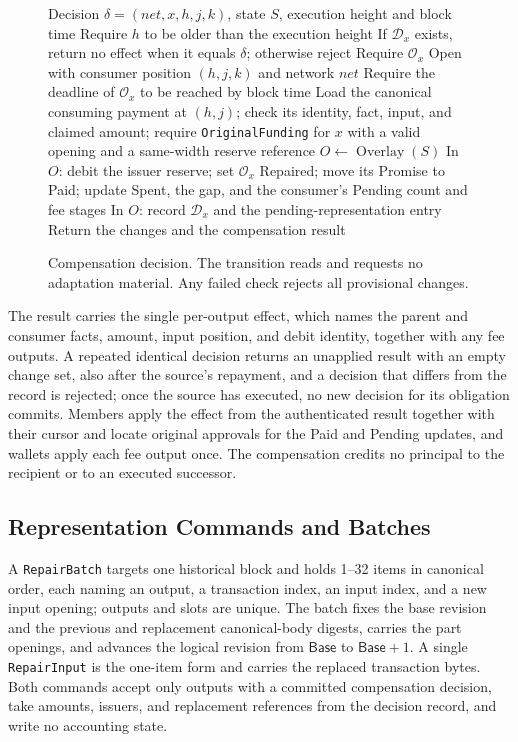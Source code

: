\begin{figure}[t]
  \small
  \begin{algorithmic}[1]
    \REQUIRE Decision $\delta=(\mathit{net},x,h,j,k)$, state $S$,
    execution height and block time
    \STATE Require $h$ to be older than the execution height
    \STATE If $\mathcal D_x$ exists, return no effect when it equals
    $\delta$; otherwise reject
    \STATE Require $\mathcal O_x$ Open with consumer position $(h,j,k)$
    and network $\mathit{net}$
    \STATE Require the deadline of $\mathcal O_x$ to be reached by block time
    \STATE Load the canonical consuming payment at $(h,j)$; check its
    identity, fact, input, and claimed amount; require
    \texttt{OriginalFunding} for $x$ with a valid opening and a
    same-width reserve reference
    \STATE $O\gets\operatorname{Overlay}(S)$
    \STATE In $O$: debit the issuer reserve; set $\mathcal O_x$ Repaired;
    move its Promise to Paid; update Spent, the gap, and the consumer's
    Pending count and fee stages
    \STATE In $O$: record $\mathcal D_x$ and the pending-representation
    entry
    \STATE Return the changes and the compensation result
  \end{algorithmic}
  \caption{Compensation decision. The transition reads and requests no
    adaptation material. Any failed check rejects all provisional
    changes.}
  \label{fig:protocol-decision}
\end{figure}

The result carries the single per-output effect, which names the parent and consumer facts, amount, input position, and debit identity, together with any fee outputs. A repeated identical decision returns an unapplied result with an empty change set, also after the source's repayment, and a decision that differs from the record is rejected; once the source has executed, no new decision for its obligation commits. Members apply the effect from the authenticated result together with their cursor and locate original approvals for the Paid and Pending updates, and wallets apply each fee output once. The compensation credits no principal to the recipient or to an executed successor.

\subsection{Representation Commands and Batches}
\label{sec:protocol-batch}

A \texttt{RepairBatch} targets one historical block and holds 1--32 items in canonical order, each naming an output, a transaction index, an input index, and a new input opening; outputs and slots are unique. The batch fixes the base revision and the previous and replacement canonical-body digests, carries the part openings, and advances the logical revision from $\mathsf{Base}$ to $\mathsf{Base}+1$. A single \texttt{RepairInput} is the one-item form and carries the replaced transaction bytes. Both commands accept only outputs with a committed compensation decision, take amounts, issuers, and replacement references from the decision record, and write no accounting state.

